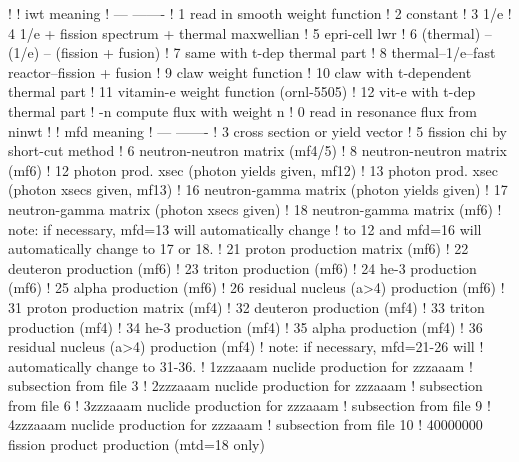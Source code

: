 \begin{ccode}
   !
   !     iwt          meaning
   !     ---          -------
   !      1           read in smooth weight function
   !      2           constant
   !      3           1/e
   !      4           1/e + fission spectrum + thermal maxwellian
   !      5           epri-cell lwr
   !      6           (thermal) -- (1/e) -- (fission + fusion)
   !      7           same with t-dep thermal part
   !      8           thermal--1/e--fast reactor--fission + fusion
   !      9           claw weight function
   !     10           claw with t-dependent thermal part
   !     11           vitamin-e weight function (ornl-5505)
   !     12           vit-e with t-dep thermal part
   !     -n           compute flux with weight n
   !      0           read in resonance flux from ninwt
   !
   !     mfd          meaning
   !     ---          -------
   !      3           cross section or yield vector
   !      5           fission chi by short-cut method
   !      6           neutron-neutron matrix (mf4/5)
   !      8           neutron-neutron matrix (mf6)
   !     12           photon prod. xsec (photon yields given, mf12)
   !     13           photon prod. xsec (photon xsecs given, mf13)
   !     16           neutron-gamma matrix (photon yields given)
   !     17           neutron-gamma matrix (photon xsecs given)
   !     18           neutron-gamma matrix (mf6)
   !         note: if necessary, mfd=13 will automatically change
   !         to 12 and mfd=16 will automatically change to 17 or 18.
   !     21           proton production matrix (mf6)
   !     22           deuteron production (mf6)
   !     23           triton production (mf6)
   !     24           he-3 production (mf6)
   !     25           alpha production (mf6)
   !     26           residual nucleus (a>4) production (mf6)
   !     31           proton production matrix (mf4)
   !     32           deuteron production (mf4)
   !     33           triton production (mf4)
   !     34           he-3 production (mf4)
   !     35           alpha production (mf4)
   !     36           residual nucleus (a>4) production (mf4)
   !          note: if necessary, mfd=21-26 will
   !          automatically change to 31-36.
   !    1zzzaaam       nuclide production for zzzaaam
   !                     subsection from file 3
   !    2zzzaaam       nuclide production for zzzaaam
   !                     subsection from file 6
   !    3zzzaaam       nuclide production for zzzaaam
   !                     subsection from file 9
   !    4zzzaaam       nuclide production for zzzaaam
   !                     subsection from file 10
   !    40000000       fission product production (mtd=18 only)

\end{ccode}
